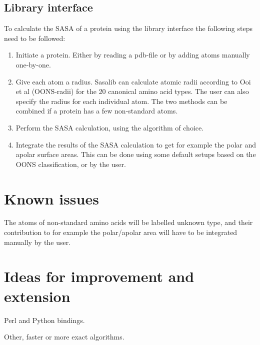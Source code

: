 \documentclass[a4paper,11pt]{article}
\begin{document}
\subsection{Library interface}

To calculate the SASA of a protein using the library interface the
following steps need to be followed:
\begin{enumerate}
  \item Initiate a protein. Either by reading a pdb-file or by adding
    atoms manually one-by-one.
  \item Give each atom a radius. Sasalib can calculate atomic radii
    according to Ooi et al (OONS-radii) for the 20 canonical amino
    acid types. The user can also specify the radius for each
    individual atom. The two methods can be combined if a protein has
    a few non-standard atoms.
  \item Perform the SASA calculation, using the algorithm of choice.
  \item Integrate the results of the SASA calculation to get for
    example the polar and apolar surface areas. This can be done using
    some default setups based on the OONS classification, or by the
    user.
\end{enumerate}

\section{Known issues}

The atoms of non-standard amino acids will be labelled unknown type,
and their contribution to for example the polar/apolar area will have
to be integrated manually by the user.

\section{Ideas for improvement and extension}

Perl and Python bindings.

Other, faster or more exact algorithms.
\end{document}
